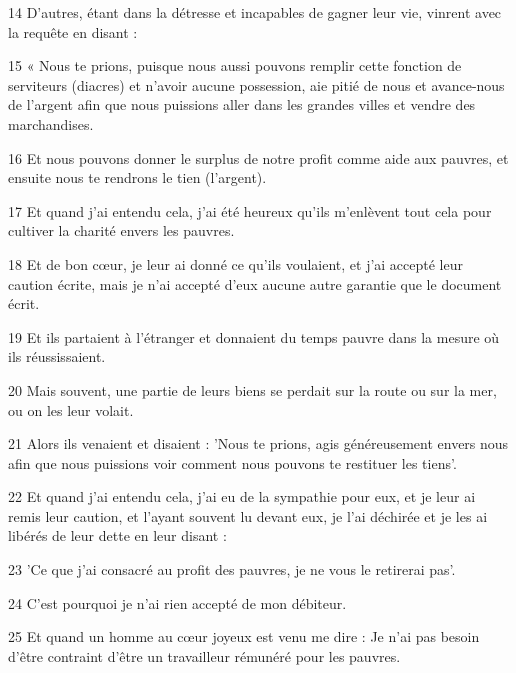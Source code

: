 \par 14 D'autres, étant dans la détresse et incapables de gagner leur vie, vinrent avec la requête en disant :

\par 15 « Nous te prions, puisque nous aussi pouvons remplir cette fonction de serviteurs (diacres) et n'avoir aucune possession, aie pitié de nous et avance-nous de l'argent afin que nous puissions aller dans les grandes villes et vendre des marchandises.

\par 16 Et nous pouvons donner le surplus de notre profit comme aide aux pauvres, et ensuite nous te rendrons le tien (l'argent).

\par 17 Et quand j'ai entendu cela, j'ai été heureux qu'ils m'enlèvent tout cela pour cultiver la charité envers les pauvres.

\par 18 Et de bon cœur, je leur ai donné ce qu'ils voulaient, et j'ai accepté leur caution écrite, mais je n'ai accepté d'eux aucune autre garantie que le document écrit.

\par 19 Et ils partaient à l'étranger et donnaient du temps pauvre dans la mesure où ils réussissaient.

\par 20 Mais souvent, une partie de leurs biens se perdait sur la route ou sur la mer, ou on les leur volait.

\par 21 Alors ils venaient et disaient : 'Nous te prions, agis généreusement envers nous afin que nous puissions voir comment nous pouvons te restituer les tiens'.

\par 22 Et quand j'ai entendu cela, j'ai eu de la sympathie pour eux, et je leur ai remis leur caution, et l'ayant souvent lu devant eux, je l'ai déchirée et je les ai libérés de leur dette en leur disant :

\par 23 'Ce que j'ai consacré au profit des pauvres, je ne vous le retirerai pas'.

\par 24 C'est pourquoi je n'ai rien accepté de mon débiteur.

\par 25 Et quand un homme au cœur joyeux est venu me dire : Je n'ai pas besoin d'être contraint d'être un travailleur rémunéré pour les pauvres.

